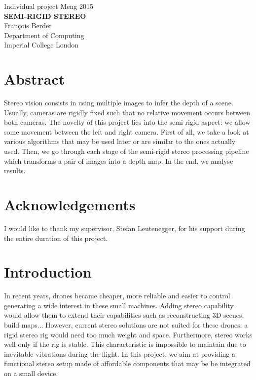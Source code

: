 \documentclass[11pt]{report}
\begin{document}
\LinesNumbered
\begin{titlepage}
	
	\begin{center}
	   
	\vspace*{3cm}
	
	{\Large Individual project Meng 2015}\\[1cm]
	{ \huge \bfseries \textsc{SEMI-RIGID STEREO}}\\[0.2cm]
	
     \vfill
	  	Fran\c{c}ois Berder\\
      Department of Computing\\
      Imperial College London\\

	\end{center}
\end{titlepage}

\chapter*{Abstract}

Stereo vision consists in using multiple images to infer the depth of a scene. Usually, cameras are rigidly fixed such that no relative movement occurs between both cameras. The novelty of this project lies into the semi-rigid aspect: we allow some movement between the left and right camera. First of all, we take a look at various algorithms that may be used later or are similar to the ones actually used. Then, we go through each stage of the semi-rigid stereo processing pipeline which transforms a pair of images into a depth map. In the end, we analyse results.

\chapter*{Acknowledgements}

I would like to thank my supervisor, Stefan Leutenegger, for his support during the entire duration of this project. 

\tableofcontents

\chapter*{Introduction}
\label{chap:Introduction}
In recent years, drones became cheaper, more reliable and easier to control generating a wide interest in these small machines. Adding stereo capability would allow them to extend their capabilities such as reconstructing 3D scenes, build maps... However, current stereo solutions are not suited for these drones: a rigid stereo rig would need too much weight and space. Furthermore, stereo works well only if the rig is stable. This characteristic is impossible to maintain due to inevitable vibrations during the flight. In this project, we aim at providing a functional stereo setup made of affordable components that may be be integrated on a small device.
\end{document}
